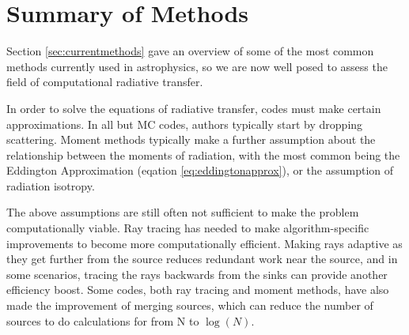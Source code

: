 
%
%

\section{Summary of Methods}
\label{sec:summaryofmethods}

Section \ref{sec:currentmethods} gave an overview of some of the most common methods currently used in astrophysics, so we are now well posed to assess the field of computational radiative transfer.

In order to solve the equations of radiative transfer, codes must make certain approximations. In all but MC codes, authors typically start by dropping scattering. Moment methods typically make a further assumption about the relationship between the moments of radiation, with the most common being the Eddington Approximation (eqation \ref{eq:eddingtonapprox}), or the assumption of radiation isotropy.

The above assumptions are still often not sufficient to make the problem computationally viable. Ray tracing has needed to make algorithm-specific improvements to become more computationally efficient. Making rays adaptive as they get further from the source reduces redundant work near the source, and in some scenarios, tracing the rays backwards from the sinks can provide another efficiency boost. Some codes, both ray tracing and moment methods, have also made the improvement of merging sources, which can reduce the number of sources to do calculations for from N to $\log(N)$.

